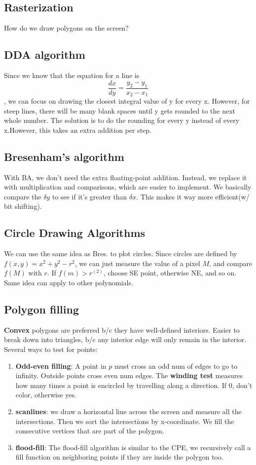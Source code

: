 \documentclass[landscape,4pt,a4paper]{article}
\begin{document}
\raggedright
\begin{multicols*}{5}
	\section{Rasterization}
		How do we draw polygons on the screen?
		\subsection{DDA algorithm}
			Since we know that the equation for a line is \[ \frac{dx}{dy} = \frac{y_{2} - y_{1}}{x_{2}-x_{1}}\],
			we can focus on drawing the closest integral value of y for every x. However, for steep lines, there 
			will be many blank spaces until y gets rounded to the next whole number. The solution is to do the 
			rounding for every y instead of every x.However, this takes an extra addition per step.
		\subsection{Bresenham's algorithm}
			With BA, we don't need the extra floating-point addition. Instead, we replace it with multiplication and
			comparisons, which are easier to implement. We basically compare the $\delta y$ to see if it's greater than
			$\delta x$. This makes it way more efficient(w/ bit shifting).
		\subsection{Circle Drawing Algorithms}
			 We can use the same idea as Bres. to plot circles. Since circles are defined by $f(x,y) = x^{2}+y^{2}-r^{2}$,
			 we can just measure the value of a pixel $M$, and compare $f(M)$ with $r$. If $f(m) > r^(2)$, choose SE point,
			 otherwise NE, and so on. Same idea can apply to other polynomials.
		\subsection{Polygon filling}
			\textbf{Convex} polygons are preferred b/c they have well-defined interiors. Easier to break down into triangles, b/c
			any interior edge will only remain in the interior.
			Several ways to test for points:
			\begin{enumerate}
				\item{\textbf{Odd-even filling}}: A point in $p$ must cross an odd num of edges to go to infinity. Outside 
					points cross even num edges. The \textbf{winding test} measures how many times a point is encircled by 
					travelling along a direction. If 0, don't color, otherwise yes.
				\item{\textbf{scanlines}}: we draw a horizontal line across the screen and measure all the intersections.
					Then we sort the intersections by x-coordinate. We fill the consecutive vertices that are part of the 
					polygon.
				\item{\textbf{flood-fill}}: The flood-fill algorithm is similar to the CPE, we recursively call a fill 
					function on neighboring points if they are inside the polygon too.
			\end{enumerate}

\end{multicols*}
\end{document}
